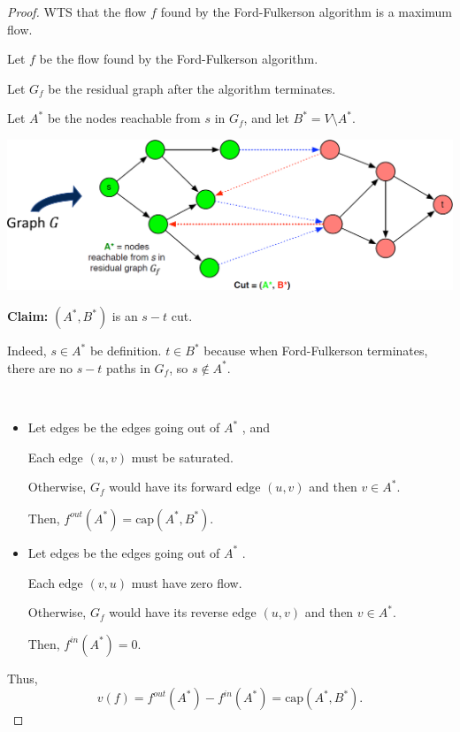 \begin{proof}
    WTS that the flow $f$ found by the Ford-Fulkerson algorithm is a maximum flow.

    Let $f$ be the flow found by the Ford-Fulkerson algorithm. 
    
    Let $G_f$ be the residual graph after the algorithm terminates.

    Let $A^*$ be the nodes reachable from $s$ in $G_f$, and let $B^* = V \setminus A^*$.

    \begin{center}
        \includegraphics[width=0.67\linewidth]{figures/max-flow-min-cut.png}
    \end{center}

    \textbf{Claim:} $(A^*, B^*)$ is an $s-t$ cut.

    Indeed, $s \in A^*$ be definition. $t \in B^*$ because when Ford-Fulkerson terminates, there are no $s-t$ paths in $G_f$, so $s \notin A^*$. 

    {~~~}

    \begin{itemize}
        \item Let  edges be the edges going out of $A^*$ , and 

        Each  edge $(u, v)$ must be saturated. 

        Otherwise, $G_f$ would have its forward edge $(u, v)$ and then $v \in A^*$. 

        Then, $f^{out}(A^*) = \text{cap}(A^*, B^*)$.

        \item Let  edges be the edges going out of $A^*$ .

        Each  edge $(v, u)$ must have zero flow. 

        Otherwise, $G_f$ would have its reverse edge $(u, v)$ and then $v \in A^*$.

        Then, $f^{in}(A^*) = 0$.
    \end{itemize}

    Thus, \[
        v(f) = f^{out}(A^*) - f^{in}(A^*) = \text{cap}(A^*, B^*).
    \]
\end{proof}

